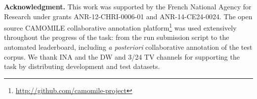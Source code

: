 \documentclass{acm_proc_article-me}
\begin{document}
\noindent\textbf{Acknowledgment.} This work was supported by the French National Agency for Research under grants ANR-12-CHRI-0006-01 and ANR-14-CE24-0024. The open source CAMOMILE collaborative annotation platform\footnote{\url{http://github.com/camomile-project}} was used extensively throughout the progress of the task: from the run submission script to the automated leaderboard, including \emph{a posteriori} collaborative annotation of the test corpus. We thank INA and the DW and 3/24 TV channels for supporting the task by distributing development and test datasets.

\newpage



\end{document}
